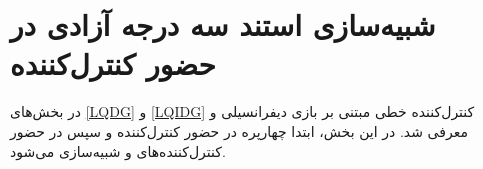 \chapter{شبیه‌سازی استند سه درجه آزادی در حضور کنترل‌کننده}\label{MIL}
در بخش‌های
\ref{LQDG}
و
\ref{LQIDG}
کنترل‌کننده خطی مبتنی بر بازی دیفرانسیلی  و  معرفی شد. در این بخش، ابتدا چهارپره در حضور کنترل‌کننده  و سپس در حضور کنترل‌کننده‌های  و  شبیه‌سازی می‌شود.
